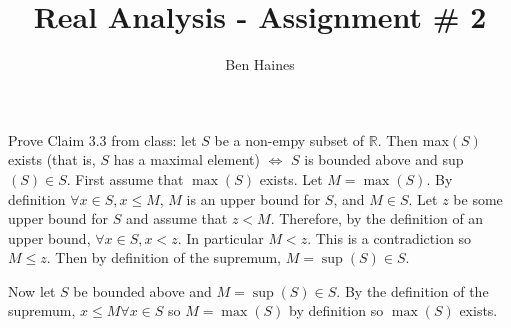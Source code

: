 \documentclass[paper=a4, fontsize=11pt]{jhwhw} %
\begin{document}
\title{Real Analysis - Assignment \# 2}
\author{Ben Haines}

Prove Claim 3.3 from class: let $S$ be a non-empy subset of $\mathbb R$. Then max$(S)$ exists (that is, $S$ has a maximal element) $\iff$ $S$ is bounded above and sup$(S)\in S$.
\solution
First assume that $\max(S)$ exists. Let $M = \max(S)$. By definition $\forall x\in S, x \le M$, $M$ is an upper bound for $S$, and $M\in S$. Let $z$ be some upper bound for $S$ and assume that $z < M$. Therefore, by the definition of an upper bound, $\forall x \in S, x < z$. In particular $M < z$. This is a contradiction so $M \le z$. Then by definition of the supremum, $M = \sup(S)\in S$. 

Now let $S$ be bounded above and $M = \sup(S)\in S$. By the definition of the supremum, $x\le M \forall x\in S$ so $M = \max(S)$ by definition so $\max(S)$ exists.
\end{document}
